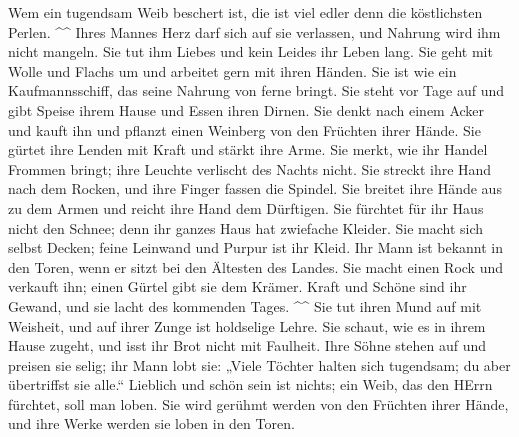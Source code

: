  Wem ein tugendsam Weib beschert ist, die ist viel edler
denn die köstlichsten Perlen. \^{}\^{}  Ihres Mannes Herz
darf sich auf sie verlassen, und Nahrung wird ihm nicht mangeln.
 Sie tut ihm Liebes und kein Leides ihr Leben lang.
 Sie geht mit Wolle und Flachs um und arbeitet gern mit
ihren Händen.  Sie ist wie ein Kaufmannsschiff, das seine
Nahrung von ferne bringt.  Sie steht vor Tage auf und
gibt Speise ihrem Hause und Essen ihren Dirnen.  Sie
denkt nach einem Acker und kauft ihn und pflanzt einen Weinberg von den
Früchten ihrer Hände.  Sie gürtet ihre Lenden mit Kraft
und stärkt ihre Arme.  Sie merkt, wie ihr Handel Frommen
bringt; ihre Leuchte verlischt des Nachts nicht.  Sie
streckt ihre Hand nach dem Rocken, und ihre Finger fassen die Spindel.
 Sie breitet ihre Hände aus zu dem Armen und reicht ihre
Hand dem Dürftigen.  Sie fürchtet für ihr Haus nicht den
Schnee; denn ihr ganzes Haus hat zwiefache Kleider.  Sie
macht sich selbst Decken; feine Leinwand und Purpur ist ihr Kleid.
 Ihr Mann ist bekannt in den Toren, wenn er sitzt bei den
Ältesten des Landes.  Sie macht einen Rock und verkauft
ihn; einen Gürtel gibt sie dem Krämer.  Kraft und Schöne
sind ihr Gewand, und sie lacht des kommenden Tages. \^{}\^{}
 Sie tut ihren Mund auf mit Weisheit, und auf ihrer Zunge
ist holdselige Lehre.  Sie schaut, wie es in ihrem Hause
zugeht, und isst ihr Brot nicht mit Faulheit.  Ihre Söhne
stehen auf und preisen sie selig; ihr Mann lobt sie: 
„Viele Töchter halten sich tugendsam; du aber übertriffst sie alle.``
 Lieblich und schön sein ist nichts; ein Weib, das den
HErrn fürchtet, soll man loben.  Sie wird gerühmt werden
von den Früchten ihrer Hände, und ihre Werke werden sie loben in den
Toren.
